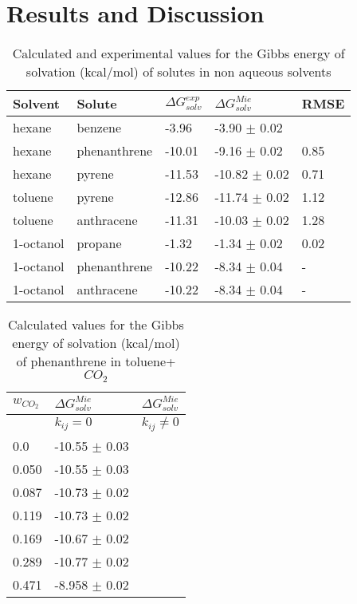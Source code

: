 \chapter{Results and Discussion} %

\label{Chapter5} %

\begin{table*}[h]
\center
  \caption{Calculated and experimental values for the Gibbs energy of solvation (kcal/mol) of solutes in non aqueous solvents}
  \label{tbl:solv1}
  \begin{tabular}{lllll}
    \hline
      Solvent & Solute & $\Delta G_{solv}^{exp}$ & $\Delta G_{solv}^{Mie}$ & RMSE \\
    \hline
    hexane    & benzene      & -3.96  & -3.90  $\pm$ 0.02 &  \\
    hexane    & phenanthrene & -10.01 & -9.16  $\pm$ 0.02 & 0.85 \\
    hexane    & pyrene       & -11.53 & -10.82 $\pm$ 0.02 & 0.71 \\
    toluene   & pyrene       & -12.86 & -11.74 $\pm$ 0.02 & 1.12\\
    toluene   & anthracene   & -11.31 & -10.03 $\pm$ 0.02 & 1.28\\
    1-octanol & propane      & -1.32  & -1.34  $\pm$ 0.02 & 0.02 \\
    1-octanol & phenanthrene & -10.22 & -8.34  $\pm$ 0.04 & - \\
    1-octanol & anthracene   & -10.22 & -8.34  $\pm$ 0.04 & - \\
    \hline
  \end{tabular}

\end{table*}

\begin{table}[h]
\center
  \caption{Calculated values for the Gibbs energy of solvation (kcal/mol) of phenanthrene in toluene+$CO_{2}$}
  \label{tbl:solv3}
  \begin{tabular}{lll}
    \hline
      $w_{CO_{2}}$ & $\Delta G_{solv}^{Mie}$ & $\Delta G_{solv}^{Mie}$\\
    \hline
     & $k_{ij}=0$& $k_{ij} \neq 0$\\
    \hline
    0.0    & -10.55 $\pm$ 0.03  & \\
    0.050  & -10.55 $\pm$ 0.03  & \\
    0.087  & -10.73 $\pm$ 0.02  & \\
    0.119  & -10.73 $\pm$ 0.02  & \\
    0.169  & -10.67 $\pm$ 0.02  & \\
    0.289  & -10.77 $\pm$ 0.02  & \\
    0.471  & -8.958 $\pm$ 0.02  & \\
    \hline
  \end{tabular}

\end{table}

